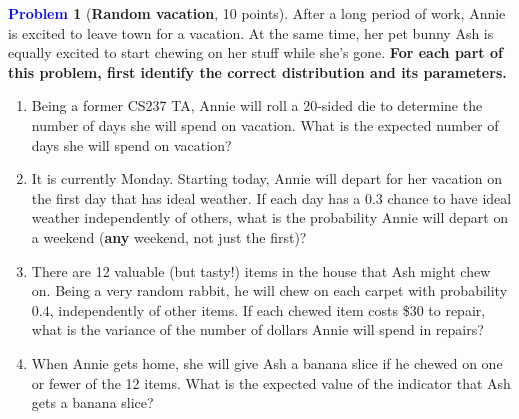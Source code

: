 \documentclass[letterpaper,11pt]{article}
\theoremstyle{plain}%
\theoremstyle{definition}
\newtheorem{problem}{\textcolor{blue}{Problem}}
\theoremstyle{plain}%
\begin{document}
\begin{problem}[\textbf{Random vacation}, 10 points] After a long period of work, Annie is excited to leave town for a vacation. At the same time, her pet bunny Ash is equally excited to start chewing on her stuff while she's gone. \textbf{For each part of this problem, first identify the correct distribution and its parameters.}

    \begin{enumerate}[label=(\alph*)]
        \item Being a former CS237 TA, Annie will roll a 20-sided die to determine the number of days she will spend on vacation. What is the expected number of days she will spend on vacation?
        \item It is currently Monday. Starting today, Annie will depart for her vacation on the first day that has ideal weather. If each day has a $0.3$ chance to have ideal weather independently of others, what is the probability Annie will depart on a weekend (\textbf{any} weekend, not just the first)?
        \item There are 12 valuable (but tasty!) items in the house that Ash might chew on. Being a very random rabbit, he will chew on each carpet with probability $0.4$, independently of other items. If each chewed item costs \$30 to repair, what is the variance of the number of dollars Annie will spend in repairs?
        \item When Annie gets home, she will give Ash a banana slice if he chewed on one or fewer of the 12 items. What is the expected value of the indicator that Ash gets a banana slice?
    \end{enumerate}
\end{problem}
\end{document}
